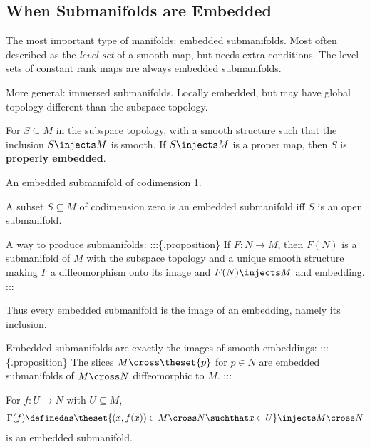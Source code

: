 \hypertarget{when-submanifolds-are-embedded}{%
\subsection{When Submanifolds are
Embedded}\label{when-submanifolds-are-embedded}}

The most important type of manifolds: embedded submanifolds. Most often
described as the \emph{level set} of a smooth map, but needs extra
conditions. The level sets of constant rank maps are always embedded
submanifolds.

More general: immersed submanifolds. Locally embedded, but may have
global topology different than the subspace topology.

\begin{definition}

For \(S\subseteq M\) in the subspace topology, with a smooth structure
such that the inclusion \(S\injects M\) is smooth. If \(S\injects M\) is
a proper map, then \(S\) is \textbf{properly embedded}.

\end{definition}

\begin{definition}

An embedded submanifold of codimension 1.

\end{definition}

\begin{proposition}

A subset \(S\subseteq M\) of codimension zero is an embedded submanifold
iff \(S\) is an open submanifold.

\end{proposition}

A way to produce submanifolds: :::\{.proposition\} If \(F:N\to M\), then
\(F(N)\) is a submanifold of \(M\) with the subspace topology and a
unique smooth structure making \(F\) a diffeomorphism onto its image and
\(F(N)\injects M\) and embedding. :::

Thus every embedded submanifold is the image of an embedding, namely its
inclusion.

Embedded submanifolds are exactly the images of smooth embeddings:
:::\{.proposition\} The slices \(M\cross\theset{p}\) for \(p\in N\) are
embedded submanifolds of \(M\cross N\) diffeomorphic to \(M\). :::

\begin{proposition}

For \(f:U\to N\) with \(U\subseteq M\),
\begin{align*}  
\Gamma(f) \definedas \theset{(x, f(x)) \in M\cross N \suchthat x\in U} \injects M\cross N
\end{align*} is an embedded submanifold.

\end{proposition}

